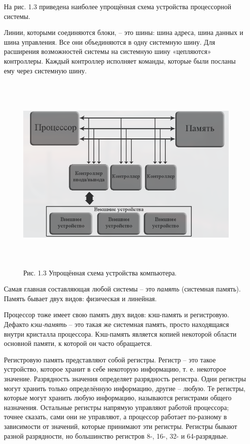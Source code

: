 	\par На рис. 1.3 приведена наиболее упрощённая схема устройства процессорной
	системы.
	
	\par Линии, которыми соединяются блоки, – это шины: шина адреса, шина данных
	и шина управления. Все они объединяются в одну системную шину. Для расширения возможностей системы на системную шину «цепляются» контроллеры. Каждый контроллер исполняет команды, которые были посланы ему через системную шину.
	
	\begin{figure}[h]
		\centering
		\includegraphics[height=10cm]{img/1.3} 
		\captionsetup{font=footnotesize} 
		\caption*{Рис. 1.3 Упрощённая схема устройства компьютера.} 
	\end{figure}
	
	\par Самая главная составляющая любой системы – это \textit{память} (системная память). Память бывает двух видов: физическая и линейная.
	
	\par Процессор тоже имеет свою память двух видов: кэш-память и регистровую. Дефакто \textit{кэш-память} – это такая же системная память, просто находящаяся внутри кристалла процессора. Кэш-память является копией некоторой области основной памяти, к которой он часто обращается.
	
	\par Регистровую память представляют собой регистры. Регистр – это такое устройство, которое хранит в себе некоторую информацию, т. е. некоторое значение. Разрядность значения определяет разрядность регистра. Одни регистры могут хранить только определённую информацию, другие – любую. Те регистры, которые могут хранить любую информацию, называются регистрами общего назначения. Остальные регистры напрямую управляют работой процессора; точнее сказать, сами они не управляют, а процессор работает по-разному в зависимости от значений, которые принимают эти регистры. Регистры бывают разной разрядности, но большинство регистров 8-, 16-, 32- и 64-разрядные. 
	
